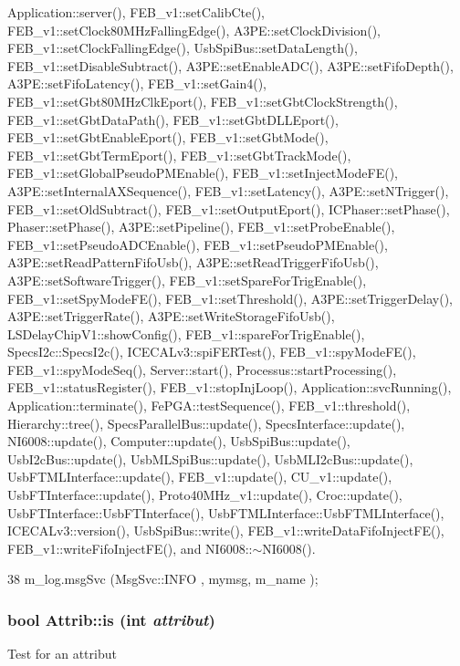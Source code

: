 Application::server(), FEB\_\-v1::setCalibCte(), FEB\_\-v1::setClock80MHzFallingEdge(), A3PE::setClockDivision(), FEB\_\-v1::setClockFallingEdge(), UsbSpiBus::setDataLength(), FEB\_\-v1::setDisableSubtract(), A3PE::setEnableADC(), A3PE::setFifoDepth(), A3PE::setFifoLatency(), FEB\_\-v1::setGain4(), FEB\_\-v1::setGbt80MHzClkEport(), FEB\_\-v1::setGbtClockStrength(), FEB\_\-v1::setGbtDataPath(), FEB\_\-v1::setGbtDLLEport(), FEB\_\-v1::setGbtEnableEport(), FEB\_\-v1::setGbtMode(), FEB\_\-v1::setGbtTermEport(), FEB\_\-v1::setGbtTrackMode(), FEB\_\-v1::setGlobalPseudoPMEnable(), FEB\_\-v1::setInjectModeFE(), A3PE::setInternalAXSequence(), FEB\_\-v1::setLatency(), A3PE::setNTrigger(), FEB\_\-v1::setOldSubtract(), FEB\_\-v1::setOutputEport(), ICPhaser::setPhase(), Phaser::setPhase(), A3PE::setPipeline(), FEB\_\-v1::setProbeEnable(), FEB\_\-v1::setPseudoADCEnable(), FEB\_\-v1::setPseudoPMEnable(), A3PE::setReadPatternFifoUsb(), A3PE::setReadTriggerFifoUsb(), A3PE::setSoftwareTrigger(), FEB\_\-v1::setSpareForTrigEnable(), FEB\_\-v1::setSpyModeFE(), FEB\_\-v1::setThreshold(), A3PE::setTriggerDelay(), A3PE::setTriggerRate(), A3PE::setWriteStorageFifoUsb(), LSDelayChipV1::showConfig(), FEB\_\-v1::spareForTrigEnable(), SpecsI2c::SpecsI2c(), ICECALv3::spiFERTest(), FEB\_\-v1::spyModeFE(), FEB\_\-v1::spyModeSeq(), Server::start(), Processus::startProcessing(), FEB\_\-v1::statusRegister(), FEB\_\-v1::stopInjLoop(), Application::svcRunning(), Application::terminate(), FePGA::testSequence(), FEB\_\-v1::threshold(), Hierarchy::tree(), SpecsParallelBus::update(), SpecsInterface::update(), NI6008::update(), Computer::update(), UsbSpiBus::update(), UsbI2cBus::update(), UsbMLSpiBus::update(), UsbMLI2cBus::update(), UsbFTMLInterface::update(), FEB\_\-v1::update(), CU\_\-v1::update(), UsbFTInterface::update(), Proto40MHz\_\-v1::update(), Croc::update(), UsbFTInterface::UsbFTInterface(), UsbFTMLInterface::UsbFTMLInterface(), ICECALv3::version(), UsbSpiBus::write(), FEB\_\-v1::writeDataFifoInjectFE(), FEB\_\-v1::writeFifoInjectFE(), and NI6008::$\sim$NI6008().


\begin{DoxyCode}
38 { m_log.msgSvc (MsgSvc::INFO    , mymsg, m_name ); }
\end{DoxyCode}
\hypertarget{classAttrib_a704f26af560909ad22065083bb7d4c34}{
\subsubsection[{is}]{\setlength{\rightskip}{0pt plus 5cm}bool Attrib::is (int {\em attribut})}}
\label{classAttrib_a704f26af560909ad22065083bb7d4c34}
Test for an attribut 

